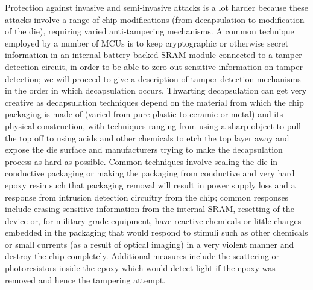Protection against invasive and semi-invasive attacks is a lot harder because these attacks involve a range of chip modifications (from decapsulation to modification of the die), requiring varied anti-tampering mechanisms. A common technique employed by a number of MCUs is to keep cryptographic or otherwise secret information in an internal battery-backed SRAM \citep{hwre}\citep{sergei:thesis} module connected to a tamper detection circuit, in order to be able to zero-out sensitive information on tamper detection; we will proceed to give a description of tamper detection mechanisms in the order in which decapsulation occurs. Thwarting decapsulation can get very creative as decapsulation techniques depend on the material from which the chip packaging is made of (varied from pure plastic to ceramic or metal) and its physical construction, with techniques ranging from using a sharp object to pull the top off \citep{sergei:thesis} to using acids and other chemicals \citep{hwre}\citep{sergei:thesis} to etch the top layer away and expose the die surface and manufacturers trying to make the decapsulation process as hard as possible. Common techniques involve sealing the die in conductive packaging or making the packaging from conductive and very hard epoxy resin such that packaging removal will result in power supply loss and a response from intrusion detection circuitry from the chip; common responses include erasing sensitive information from the internal SRAM\citep{hwre}, resetting of the device \citep{sergei:thesis} or, for military grade equipment, have reactive chemicals or little charges embedded in the packaging that would respond to stimuli such as other chemicals or small currents (as a result of optical imaging) in a very violent manner and destroy the chip completely. Additional measures include the scattering or photoresistors inside the epoxy which would detect light if the epoxy was removed and hence the tampering attempt\citep{sergei:thesis}\citep{hwre}.

